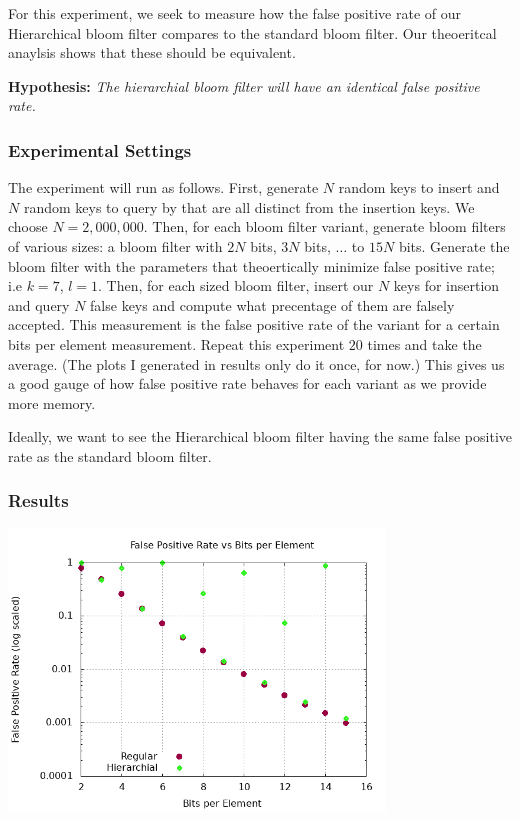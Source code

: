 \documentclass[a4paper]{article}
\theoremstyle{plain}
\theoremstyle{definition}
\begin{document}
	For this experiment, we seek to measure how the false positive rate of our Hierarchical bloom filter compares to the standard bloom filter. 
	Our theoeritcal anaylsis shows that these should be equivalent.
	
	\textbf{Hypothesis:} \textit{The hierarchial bloom filter will have an identical false positive rate.}

	\subsubsection{Experimental Settings}
	The experiment will run as follows. First, generate $N$ random keys to insert and $N$ random keys to query by that are all distinct from the insertion keys.
	We choose $N= 2,000,000$. Then, for each bloom filter variant, generate bloom filters of various sizes: a bloom filter with $2N$ bits, $3N$ bits, $\ldots$ to $15N$ bits. 
	Generate the bloom filter with the parameters that theoertically minimize false positive rate; i.e $k=7$, $l=1$.
	Then, for each sized bloom filter, insert our $N$ keys for insertion and query $N$ false keys and compute what precentage of them are falsely accepted.
	This measurement is the false positive rate of the variant for a certain bits per element measurement.
	Repeat this experiment $20$ times and take the average. (The plots I generated in results only do it once, for now.)
	This gives us a good gauge of how false positive rate behaves for each variant as we provide more memory.
	
	Ideally, we want to see the Hierarchical bloom filter having the same false positive rate as the standard bloom filter.

	\subsubsection{Results}
	\begin{center}
		\includegraphics[width=10cm]{../plots/fp.png}
	\end{center}
\end{document}
